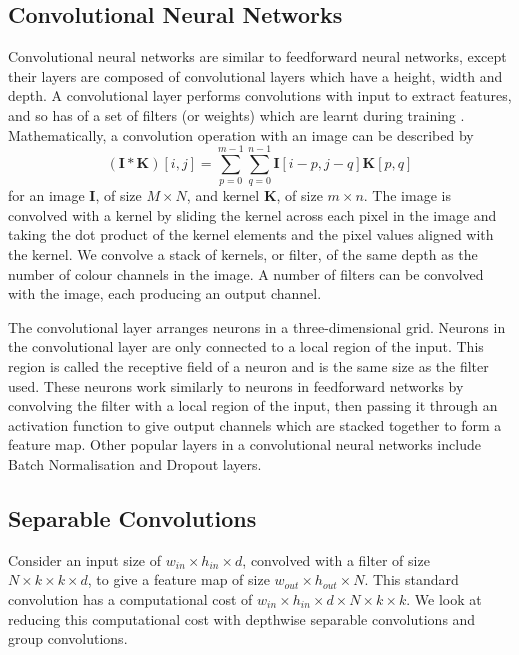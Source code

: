 \documentclass[conference]{IEEEtran}
\begin{document}
\subsection{Convolutional Neural Networks}
Convolutional neural networks are similar to feedforward neural networks, except their layers are composed of convolutional layers which have a height, width and depth. A convolutional layer performs convolutions with input to extract features, and so has of a set of filters (or weights) which are learnt during training \cite{Goodfellow-et-al-2016}. Mathematically, a convolution operation with an image can be described by
\begin{equation}
    (\mathbf{I}*\mathbf{K})[i,j]=\sum_{p=0}^{m-1}\sum_{q=0}^{n-1}\mathbf{I}[i-p,j-q]\mathbf{K}[p,q]
\end{equation}
for an image $\mathbf{I}$, of size $M \times N$, and kernel $\mathbf{K}$, of size $m \times n$. The image is convolved with a kernel by sliding the kernel across each pixel in the image and taking the dot product of the kernel elements and the pixel values aligned with the kernel. We convolve a stack of kernels, or filter, of the same depth as the number of colour channels in the image. A number of filters can be convolved with the image, each producing an output channel.

The convolutional layer arranges neurons in a three-dimensional grid. Neurons in the convolutional layer are only connected to a local region of the input. This region is called the receptive field of a neuron and is the same size as the filter used. These neurons work similarly to neurons in feedforward networks by convolving the filter with a local region of the input, then passing it through an activation function to give output channels which are stacked together to form a feature map. Other popular layers in a convolutional neural networks include Batch Normalisation \cite{ioffe2015batch} and  Dropout \cite{srivastava2014dropout} layers.


\subsection{Separable Convolutions}
Consider an input size of $w_{in} \times h_{in} \times d$, convolved with a filter of size $N \times k \times k \times d$, to give a feature map of size $w_{out} \times h_{out} \times N$. This standard convolution has a computational cost of $w_{in} \times h_{in} \times d \times N \times k \times k$. We look at reducing this computational cost with depthwise separable convolutions and group convolutions.
\end{document}
